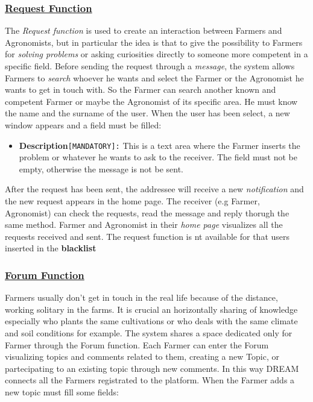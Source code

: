 	\subsubsection[Request Function]{\hyperlink{toc}{Request Function}}
		\label{sec:requestFunction}
	The \textit{Request function} is used to create an interaction between Farmers and Agronomists, but in particular the idea is that to give the possibility to Farmers for \textit{solving problems} or asking curiosities directly to someone more competent in a specific field. Before sending the request through a \textit{message}, the system allows Farmers to \textit{search} whoever he wants and select the Farmer or the Agronomist he wants to get in touch with. So the Farmer can search another known and competent Farmer or maybe the Agronomist of its specific area. He must know the name and the surname of the user. When the user has been select, a new window appears and a field must be filled:
		 
		\begin{itemize}
			\item \textbf{Description}\texttt{[MANDATORY]:} This is a text area where the Farmer inserts the problem or whatever he wants to ask to the receiver. The field must not be empty, otherwise the message is not be sent. 
		\end{itemize}
	
	After the request has been sent, the addressee will receive a new \textit{notification} and the new request appears in the home page. The receiver (e.g Farmer, Agronomist) can check the requests, read the message and reply thorugh the same method. Farmer and Agronomist in their \textit{home page} visualizes all the requests received and sent. The request function is nt available for that users inserted in the \textbf{blacklist}
	
	\subsubsection[Forum Function]{\hyperlink{toc}{Forum Function}}
		\label{sec:forumFunction}
	Farmers usually don't get in touch in the real life because of the distance, working solitary in the farms. It is crucial an horizontally sharing of knowledge especially who plants the same cultivations or who deals with the same climate and soil conditions for example. The system shares a space dedicated only for Farmer through the Forum function. Each Farmer can enter the Forum visualizing topics and comments related to them, creating a new Topic, or partecipating to an existing topic through new comments. In this way DREAM connects all the Farmers registrated to the platform. When the Farmer adds a new topic must fill some fields:
	
